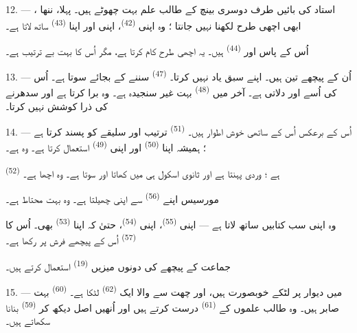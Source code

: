 12. --- استاد کی بائیں طرف دوسری بینچ کے طالب علم بہت چھوٹے ہیں۔
پہلا، ننھا ، ابھی اچھی طرح لکھنا نہیں جانتا ؛ وہ اپنی
 \textsuperscript{(42)}، اپنی  اور اپنا
 \textsuperscript{(43)} ساتھ لاتا ہے۔

اُس کے پاس  اور  \textsuperscript{(44)}
ہیں۔ یہ اچھی طرح کام کرتا ہے، مگر اُس کا  بہت بے ترتیب
ہے۔

13. --- اُن کے پیچھے تین  ہیں۔  اپنے
سبق یاد نہیں کرتا۔  \textsuperscript{(47)} سننے کے بجائے
سوتا ہے۔ اُس کی  اُسے  اور 
دلاتی ہے۔ آخر میں  \textsuperscript{(48)} بہت غیر
سنجیدہ ہے۔ وہ برا  کرتا ہے اور سدھرنے کی ذرا کوشش نہیں
کرتا۔

14. --- اُس کے برعکس اُس کے ساتھی خوش اطوار ہیں۔ 
\textsuperscript{(51)} ترتیب اور سلیقے کو پسند کرتا ہے ؛ ہمیشہ اپنا
 \textsuperscript{(50)} اور اپنی 
\textsuperscript{(49)} استعمال کرتا ہے۔ وہ  ہے۔

 \textsuperscript{(52)}  ہے ؛
وردی پہنتا ہے اور ثانوی اسکول ہی میں کھاتا اور سوتا ہے۔ وہ اچھا
 ہے۔

مورسیس اپنے  \textsuperscript{(56)} سے اپنی 
چھیلتا ہے۔ وہ بہت محتاط ہے۔

وہ اپنی سب کتابیں ساتھ لاتا ہے — اپنی 
\textsuperscript{(55)}، اپنی  \textsuperscript{(54)}، حتیٰ
کہ اپنا  \textsuperscript{(53)} بھی۔ اُس کا
 \textsuperscript{(57)} اُس کے پیچھے فرش پر رکھا ہے۔

جماعت کے پیچھے کی دونوں میزیں 
\textsuperscript{(19)} استعمال کرتے ہیں۔

\VUsaut{4.6mm}
\VUsaut{3.4mm}

15. ---  میں دیوار پر لٹکے خوبصورت
 ہیں، اور چھت سے  والا ایک
 \textsuperscript{(62)} لٹکا ہے۔ 
\textsuperscript{(60)} بہت صابر ہیں۔ وہ طالب علموں کے 
\textsuperscript{(61)} درست کرتے ہیں اور اُنھیں اصل دیکھ کر
 \textsuperscript{(59)} بنانا سکھاتے ہیں۔

